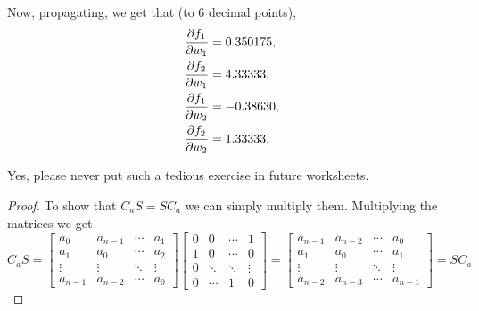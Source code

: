 \documentclass[twoside]{article}
\begin{document}
Now, propagating, we get that (to 6 decimal points),
\begin{align*}
	\pdv{f_{1}}{w_{1}} & = 0.350175, \\
	\pdv{f_{2}}{w_{1}} & = 4.33333,  \\
	\pdv{f_{1}}{w_{2}} & = -0.38630, \\
	\pdv{f_{2}}{w_{2}} & = 1.33333.
\end{align*}

Yes, please never put such a tedious exercise in future worksheets.


\begin{proof}
	To show that $C_{a}S = SC_{a}$ we can simply multiply them. Multiplying the matrices we get
	\begin{equation*}
		C_{a}S =
		\begin{bmatrix}
			a_{0}     & a_{n - 1} & \cdots & a_{1}  \\
			a_{1}     & a_{0}     & \cdots & a_{2}  \\
			\vdots    & \vdots    & \ddots & \vdots \\
			a_{n - 1} & a_{n - 2} & \cdots & a_{0}
		\end{bmatrix}
		\begin{bmatrix}
			0 & 0      & \cdots & 1      \\
			1 & 0      & \cdots & 0      \\
			0 & \ddots & \ddots & \vdots \\
			0 & \cdots & 1      & 0
		\end{bmatrix}
		=
		\begin{bmatrix}
			a_{n - 1} & a_{n - 2} & \cdots & a_{0}     \\
			a_{1}     & a_{0}     & \cdots & a_{1}     \\
			\vdots    & \vdots    & \ddots & \vdots    \\
			a_{n - 2} & a_{n - 3} & \cdots & a_{n - 1}
		\end{bmatrix}
		= SC_{a}
	\end{equation*}
\end{proof}
\end{document}
